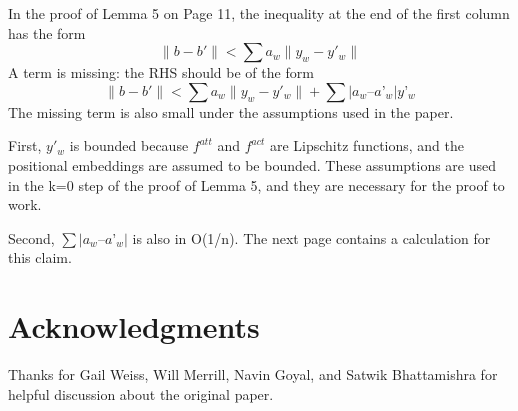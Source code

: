 \documentclass[11pt,letterpaper]{article}
\begin{document}
In the proof of Lemma 5 on Page 11, the inequality at the end of the first column has the form
\begin{equation}
	\|b - b'\| < \sum  a_w \| y_w -y'_w\|
\end{equation}
A term is missing: the RHS should be of the form
\begin{equation}
	\|b - b'\| < \sum  a_w \| y_w -y'_w\| + \sum |a_w – a’_w| y’_w
\end{equation}
The missing term is also small under the assumptions used in the paper.

First, $y'_w$ is bounded because $f^{att}$ and $f^{act}$ are Lipschitz functions, and the positional embeddings are assumed to be bounded. These assumptions are used in the k=0 step of the proof of Lemma 5, and they are necessary for the proof to work.

Second, $\sum |a_w – a’_w|$ is also in O(1/n). The next page contains a calculation for this claim.





\section*{Acknowledgments}
Thanks for Gail Weiss, Will Merrill, Navin Goyal, and Satwik Bhattamishra for helpful discussion about the original paper.




\end{document}
